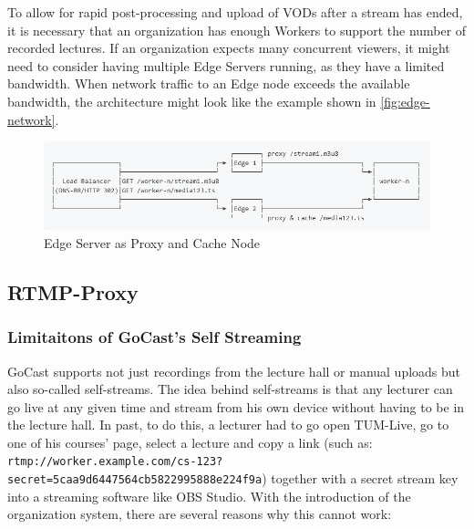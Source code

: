 To allow for rapid post-processing and upload of \ac{VOD}s after a stream has ended, it is necessary that an organization has enough Workers to support the number of recorded lectures.
If an organization expects many concurrent viewers, it might need to consider having multiple Edge Servers running, as they have a limited bandwidth.
When network traffic to an Edge node exceeds the available bandwidth, the architecture might look like the example shown in \autoref{fig:edge-network}.

\begin{figure}[htpb]
    \centering
    \includegraphics[width=\linewidth]{images/EdgeNetwork.png}
    \caption[Edge Server as Proxy and Cache Node]{Edge Server as Proxy and Cache Node}\label{fig:edge-network}
\end{figure}


\subsection{RTMP-Proxy}

\subsubsection{Limitaitons of GoCast's Self Streaming}

GoCast supports not just recordings from the lecture hall or manual uploads but also so-called self-streams. The idea behind self-streams is that any lecturer can go live at any given time and stream from his own device without having to be in the lecture hall. In past, to do this, a lecturer had to go open TUM-Live, go to one of his courses' page, select a lecture and copy a link (such as: \texttt{rtmp://worker.example.com/cs-123? secret=5caa9d6447564cb5822995888e224f9a}) together with a secret stream key into a streaming software like OBS Studio. With the introduction of the organization system, there are several reasons why this cannot work:

